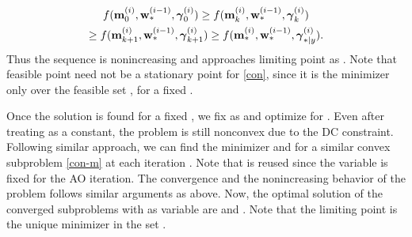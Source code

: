 \begin{multline} \label{con-convergence}
f(\iter{\mx}{0}{i},\iter{\my}{\ast}{i-1},\iter{\mz}{0}{i}) \geq f(\iter{\mx}{k}{i},\iter{\my}{\ast}{i-1},\iter{\mz}{k}{i}) \\ \geq f(\iter{\mx}{k+1}{i},\iter{\my}{\ast}{i-1},\iter{\mz}{k+1}{i}) \geq f(\iter{\mx}{\ast}{i},\iter{\my}{\ast}{i-1},\iter{\mz}{\ast|y}{i}). 
\end{multline}
Thus the sequence  is nonincreasing and approaches limiting point as . Note that feasible point  need not be a stationary point for \eqref{con}, since it is the minimizer only over the feasible set , for a fixed \me{\my}.

Once the solution is found for a fixed \me{\my}, we fix \me{\mx} as  and optimize for \me{\my}. Even after treating \me{\mx} as a constant, the problem is still nonconvex due to the \ac{DC} constraint. Following similar approach, we can find the minimizer  and  for a similar convex subproblem \eqref{con-m} at each iteration . Note that  is reused since the variable \me{\mx} is fixed for the  \ac{AO} iteration. The convergence and the nonincreasing behavior of the problem follows similar arguments as above. Now, the optimal solution of the converged subproblems with \me{\my} as variable are  and . Note that the limiting point  is the unique minimizer in the set .

